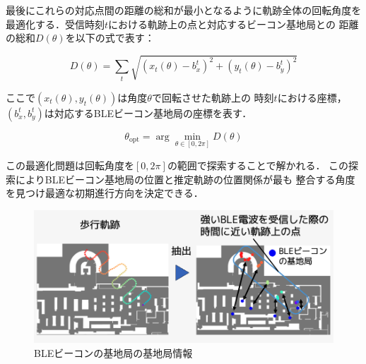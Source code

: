 最後にこれらの対応点間の距離の総和が最小となるように軌跡全体の回転角度を
最適化する．受信時刻$t$における軌跡上の点と対応するビーコン基地局との
距離の総和$D(\theta)$を以下の式で表す：

\begin{equation}
D(\theta) = \sum_{t} \sqrt{(x_t(\theta) - b_x^t)^2 + (y_t(\theta) - b_y^t)^2}
\end{equation}

ここで$(x_t(\theta), y_t(\theta))$は角度$\theta$で回転させた軌跡上の
時刻$t$における座標，$(b_x^t, b_y^t)$は対応するBLEビーコン基地局の座標を表す．

\begin{equation}
\theta_{\mathrm{opt}} = \arg\min_{\theta \in [0, 2\pi]} D(\theta)
\end{equation}

この最適化問題は回転角度を$[0, 2\pi]$の範囲で探索することで解かれる．
この探索によりBLEビーコン基地局の位置と推定軌跡の位置関係が最も
整合する角度を見つけ最適な初期進行方向を決定できる．

\begin{figure}[H]
	\centering
	\includegraphics[width=\linewidth]{../image/ble-merge.jpg}
	\caption{BLEビーコンの基地局の基地局情報}    \label{fig:ble-merge}
\end{figure}







